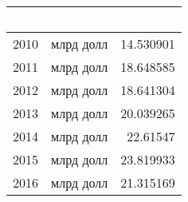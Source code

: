 \begin{tabularx}{\textwidth}{|X|l|r|}
    \hline
\rowcolor{black} \textcolor{white}{\textbf{Год}} & \textcolor{white}{\textbf{Ед. Изм.}} & \textcolor{white}{\textbf{Китай}} \\ \hline
2010 & млрд долл & 14.530901 \\ \hline
2011 & млрд долл & 18.648585 \\ \hline
2012 & млрд долл & 18.641304 \\ \hline
2013 & млрд долл & 20.039265 \\ \hline
2014 & млрд долл & 22.61547 \\ \hline
2015 & млрд долл & 23.819933 \\ \hline
2016 & млрд долл & 21.315169 \\ \hline
\end{tabularx}
